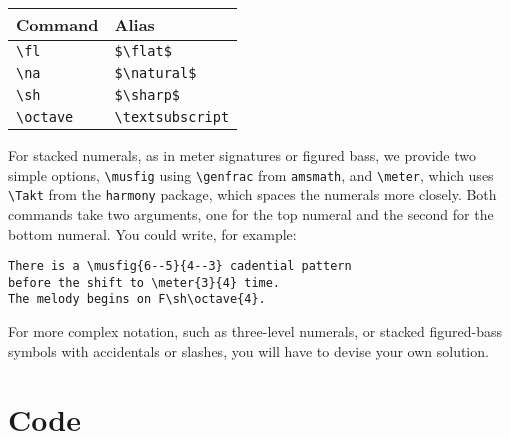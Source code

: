 \documentclass{article}
\begin{document}
\begin{center}
\begin{tabular}{ll}
\toprule
Command & Alias\\
\midrule
\verb|\fl| & \verb|$\flat$|\\
\verb|\na| & \verb|$\natural$|\\
\verb|\sh| & \verb|$\sharp$|\\
\verb|\octave| & \verb|\textsubscript|\\
\bottomrule
\end{tabular}
\end{center}

For stacked numerals, as in meter signatures or figured bass, we provide two simple options, \verb|\musfig| using \verb|\genfrac| from \texttt{amsmath}, and \verb|\meter|, which uses \verb|\Takt| from the \texttt{harmony} package, which spaces the numerals more closely.
Both commands take two arguments, one for the top numeral and the second for the bottom numeral.
You could write, for example: 

\begin{verbatim}
There is a \musfig{6--5}{4--3} cadential pattern
before the shift to \meter{3}{4} time.
The melody begins on F\sh\octave{4}.
\end{verbatim}

\begin{center}
\end{center}

For more complex notation, such as three-level numerals, or stacked figured-bass symbols with accidentals or slashes, you will have to devise your own solution.

\section{Code}

\end{document}
